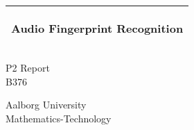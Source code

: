 %
\begin{titlepage}
  \addtolength{\hoffset}{0.5\evensidemargin-0.5\oddsidemargin} %
  \noindent%
  \begin{tabular}{@{}p{\textwidth}@{}}
    \toprule[2pt]
    \midrule
    \vspace{0.2cm}
    \begin{center}
    \Huge{\textbf{
    Audio Fingerprint Recognition  %
    }}
    \end{center}
    \vspace{0.2cm}\\
    \midrule
    \toprule[2pt]
  \end{tabular}
  \vspace{4 cm}
  \begin{center}
    {\large
      P2 Report %
    }\\
    \vspace{0.2cm}
    {\Large
      B376 %
    }
  \end{center}
  \vfill
  \begin{center}
  Aalborg University\\
  Mathematics-Technology %
  \end{center}
\end{titlepage}
\clearpage